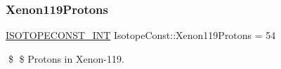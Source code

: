 \subsubsection{\texorpdfstring{Xenon119\+Protons}{Xenon119Protons}}
{\footnotesize\ttfamily \mbox{\hyperlink{group___isotope_const-_macros_ga5f18360b3e99483a35c32d789e62621c}{I\+S\+O\+T\+O\+P\+E\+C\+O\+N\+S\+T\+\_\+\+I\+NT}} Isotope\+Const\+::\+Xenon119\+Protons = 54}

\$ \$ Protons in Xenon-\/119. 